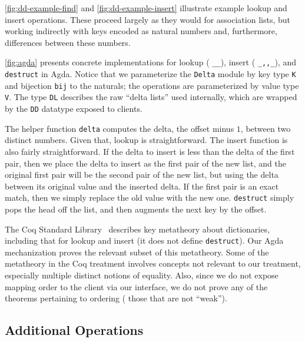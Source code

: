

\autoref{fig:dd-example-find} and \autoref{fig:dd-example-insert} illustrate example lookup and insert operations.
%
These proceed largely as they would for association lists, but working indirectly with keys encoded as natural numbers and, furthermore, differences between these numbers.

\autoref{fig:agda} presents concrete implementations for lookup (\ie{} \texttt{\_\altLAng\_\altRAng}), insert (\ie{} \texttt{\_,,\_}), and \texttt{destruct} in Agda.
%
Notice that we parameterize the \texttt{Delta} module by key type \verb+K+ and bijection \verb+bij+ to the naturals; the operations are parameterized by value type \verb+V+.
%
%
The type \verb+DL+ describes the raw ``delta lists'' used internally, which are wrapped by the \verb+DD+ datatype exposed to clients.

The helper function \verb+delta+ computes the delta, \ie{} the offset minus $1$, between two distinct numbers.
%
Given that, lookup is straightforward. The insert function is also fairly straightforward.
%
If the delta to insert is less than the delta of the first pair, then we place the delta to insert as the first pair of the new list, and
%
the original first pair will be the second pair of the new list, but using the delta between its original value and the inserted delta.
%
If the first pair is an exact match, then we simply replace the old value with the new one.
%
\verb+destruct+ simply pops the head off the list, and then augments the next key by the offset.

%
The Coq Standard Library~\citep{FMapInterface,FMapFacts} describes key metatheory about dictionaries, including that for lookup and insert (it does not define \verb+destruct+).
%
Our Agda mechanization proves the relevant subset of this metatheory. Some of the metatheory in the Coq treatment involves concepts not relevant to our treatment,
%
especially multiple distinct notions of equality. Also, since we do not expose mapping order to the client via our interface,
%
we do not prove any of the theorems pertaining to ordering (\ie{} those that are not ``weak'').


\subsection{Additional Operations}

